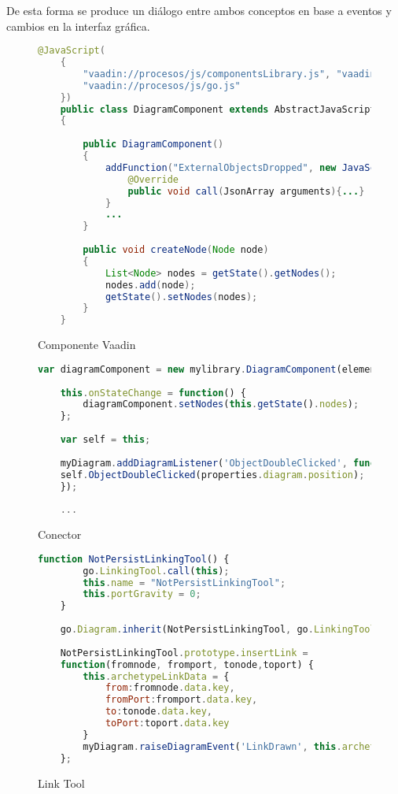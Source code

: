 De esta forma se produce un diálogo entre ambos conceptos en base a eventos y cambios en la interfaz gráfica.


\begin{figure}[!tb]
	\centering
	\begin{lstlisting}[language=Java]
	@JavaScript(
	{ 
		"vaadin://procesos/js/componentsLibrary.js", "vaadin://procesos/js/connectorSample.js", 
		"vaadin://procesos/js/go.js" 
	})
	public class DiagramComponent extends AbstractJavaScriptComponent
	{
	
		public DiagramComponent()
		{
			addFunction("ExternalObjectsDropped", new JavaScriptFunction(){
				@Override
				public void call(JsonArray arguments){...}
			}
			...
		}
	
		public void createNode(Node node)
		{
			List<Node> nodes = getState().getNodes();
			nodes.add(node);
			getState().setNodes(nodes);
		}
	}\end{lstlisting}
	\caption{Componente Vaadin}
	\label{fig:vaadinComponent}
\end{figure}


\begin{figure}[!tb]
	\centering
	\begin{lstlisting}[language=Javascript]
	var diagramComponent = new mylibrary.DiagramComponent(element);
	
	this.onStateChange = function() {
		diagramComponent.setNodes(this.getState().nodes);
	};
	
	var self = this;
	
	myDiagram.addDiagramListener('ObjectDoubleClicked', function(properties) {
	self.ObjectDoubleClicked(properties.diagram.position);
	});
	
	...

	\end{lstlisting}
	\caption{Conector}
	\label{fig:connector}
\end{figure}


\begin{figure}[!tb]
	\centering
	\begin{lstlisting}[language=Javascript]
	function NotPersistLinkingTool() {
		go.LinkingTool.call(this);
		this.name = "NotPersistLinkingTool";
		this.portGravity = 0; 
	}
	
	go.Diagram.inherit(NotPersistLinkingTool, go.LinkingTool);
	
	NotPersistLinkingTool.prototype.insertLink = 
	function(fromnode, fromport, tonode,toport) {
		this.archetypeLinkData = {
			from:fromnode.data.key,
			fromPort:fromport.data.key,
			to:tonode.data.key,
			toPort:toport.data.key
		}
		myDiagram.raiseDiagramEvent('LinkDrawn', this.archetypeLinkData);
	};\end{lstlisting}
	\caption{Link Tool}
	\label{fig:linkTool}
\end{figure}

